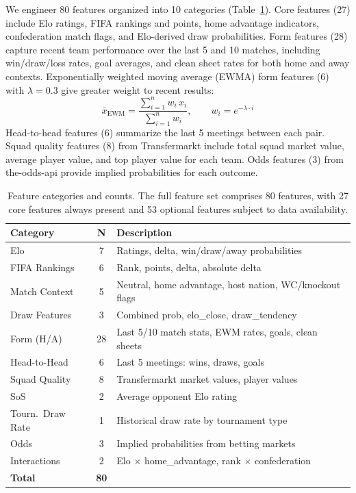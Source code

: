 \documentclass[11pt,a4paper]{article}
\newcommand{\Elo}{Elo}
\begin{document}
We engineer 80 features organized into 10 categories (Table~\ref{tab:features}). Core features (27) include \Elo{} ratings, FIFA rankings and points, home advantage indicators, confederation match flags, and \Elo{}-derived draw probabilities. Form features (28) capture recent team performance over the last 5 and 10 matches, including win/draw/loss rates, goal averages, and clean sheet rates for both home and away contexts. Exponentially weighted moving average (EWMA) form features (6) with $\lambda = 0.3$ give greater weight to recent results:
\begin{equation}
\label{eq:ewma}
\bar{x}_{\text{EWM}} = \frac{\sum_{i=1}^{n} w_i \, x_i}{\sum_{i=1}^{n} w_i}, \qquad w_i = e^{-\lambda \cdot i}
\end{equation}
Head-to-head features (6) summarize the last 5 meetings between each pair. Squad quality features (8) from Transfermarkt include total squad market value, average player value, and top player value for each team. Odds features (3) from the-odds-api provide implied probabilities for each outcome.

\begin{table}[t]
\centering
\caption{Feature categories and counts. The full feature set comprises 80 features, with 27 core features always present and 53 optional features subject to data availability.}
\label{tab:features}
\begin{tabular}{lc p{8.5cm}}
\toprule
\textbf{Category} & \textbf{N} & \textbf{Description} \\
\midrule
\Elo{}         & 7 & Ratings, delta, win/draw/away probabilities \\
FIFA Rankings  & 6 & Rank, points, delta, absolute delta \\
Match Context  & 5 & Neutral, home advantage, host nation, WC/knockout flags \\
Draw Features  & 3 & Combined prob, elo\_close, draw\_tendency \\
Form (H/A)     & 28 & Last 5/10 match stats, EWM rates, goals, clean sheets \\
Head-to-Head   & 6 & Last 5 meetings: wins, draws, goals \\
Squad Quality  & 8 & Transfermarkt market values, player values \\
SoS            & 2 & Average opponent \Elo{} rating \\
Tourn.\ Draw Rate & 1 & Historical draw rate by tournament type \\
Odds           & 3 & Implied probabilities from betting markets \\
Interactions   & 2 & \Elo{} $\times$ home\_advantage, rank $\times$ confederation \\
\midrule
\textbf{Total} & \textbf{80} & \\
\bottomrule
\end{tabular}
\end{table}
\end{document}
